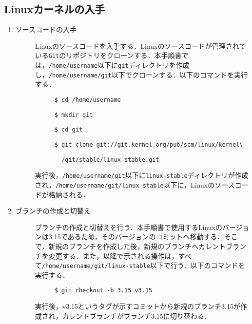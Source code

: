 \documentclass[12pt]{jsarticle}
\begin{document}
\subsection{Linuxカーネルの入手}
\begin{enumerate}
\item ソースコードの入手
  \begin{description}
  \item[] Linuxのソースコードを入手する．Linuxのソースコードが管理されている\verb|Git|のリポジトリをクローンする．本手順書では，\verb|/home/username|以下に\verb|git|ディレクトリを作成し，\verb|/home/username/git|以下でクローンする．以下のコマンドを実行する．
    \begin{description}
    \item[] \verb|$ cd /home/username|
    \item[] \verb|$ mkdir git|
    \item[] \verb|$ cd git|
    \item[] \verb|$ git clone git://git.kernel.org/pub/scm/linux/kernel\|
    \item[] \verb|  /git/stable/linux-stable.git|
    \end{description}
  \item[] 実行後，\verb|/home/username/git|以下に\verb|linux-stable|ディレクトリが作成され，\verb|/home/username/git/linux-stable|以下に，Linuxのソースコードが格納される．
  \end{description}
\item ブランチの作成と切替え
  \begin{description}
  \item[] ブランチの作成と切替えを行う．本手順書で使用するLinuxのバージョンは3.15であるため，そのバージョンのコミットへ移動する．そこで，新規のブランチを作成した後，新規のブランチへカレントブランチを変更する．また，以降で示される操作は，すべて\verb|/home/username/git/linux-stable|以下で行う．以下のコマンドを実行する．
    \begin{description}
    \item[] \verb|$ git checkout -b 3.15 v3.15|
    \end{description}
  \item[] 実行後，v3.15というタグが示すコミットから新規のブランチ3.15が作成され，カレントブランチがブランチ3.15に切り替わる．
  \end{description}
\end{enumerate}
\end{document}
